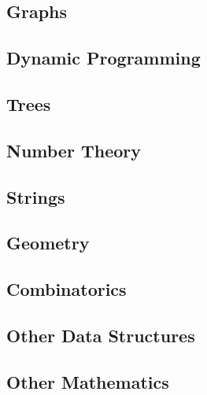 \documentclass[
	a4paper,
	landscape,
	10pt,
	article
]{article}
\begin{document}
\subsection{Graphs}

\subsection{Dynamic Programming}
\subsection{Trees}
\subsection{Number Theory}
\subsection{Strings}
\subsection{Geometry}
\subsection{Combinatorics}
\subsection{Other Data Structures}
\subsection{Other Mathematics}
\end{document}
